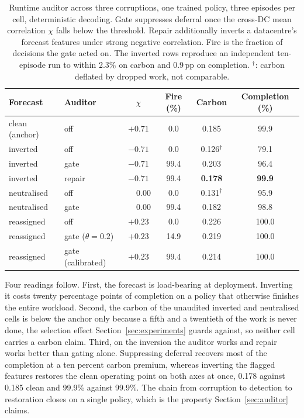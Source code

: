 \documentclass{article} %
\begin{document}
\begin{table}[ht]
\caption{Runtime auditor across three corruptions, one trained policy, three episodes per cell, deterministic decoding. Gate suppresses deferral once the cross-DC mean correlation $\chi$ falls below the threshold. Repair additionally inverts a datacentre's forecast features under strong negative correlation. Fire is the fraction of decisions the gate acted on. The inverted rows reproduce an independent ten-episode run to within 2.3\% on carbon and 0.9\,pp on completion. $^{\dagger}$: carbon deflated by dropped work, not comparable.}
\label{tab:auditor}
\centering
\small
\begin{tabular*}{\linewidth}{@{\extracolsep{\fill}}llcccc@{}}
\toprule
Forecast & Auditor & $\chi$ & Fire (\%) & Carbon & Completion (\%) \\
\midrule
clean (anchor) & off    & $+0.71$ & 0.0  & 0.185 & 99.9 \\
\addlinespace
inverted       & off    & $-0.71$ & 0.0  & 0.126$^{\dagger}$ & 79.1 \\
inverted       & gate   & $-0.71$ & 99.4 & 0.203 & 96.4 \\
inverted       & repair & $-0.71$ & 99.4 & \textbf{0.178} & \textbf{99.9} \\
\addlinespace
neutralised    & off    & $\phantom{+}0.00$ & 0.0  & 0.131$^{\dagger}$ & 95.9 \\
neutralised    & gate   & $\phantom{+}0.00$ & 99.4 & 0.182 & 98.8 \\
\addlinespace
reassigned     & off               & $+0.23$ & 0.0  & 0.226 & 100.0 \\
reassigned     & gate ($\theta{=}0.2$) & $+0.23$ & 14.9 & 0.219 & 100.0 \\
reassigned     & gate (calibrated) & $+0.23$ & 99.4 & 0.214 & 100.0 \\
\bottomrule
\end{tabular*}
\end{table}

Four readings follow. First, the forecast is load-bearing at deployment. Inverting it costs twenty percentage points of completion on a policy that otherwise finishes the entire workload. Second, the carbon of the unaudited inverted and neutralised cells is below the anchor only because a fifth and a twentieth of the work is never done, the selection effect Section~\ref{sec:experiments} guards against, so neither cell carries a carbon claim. Third, on the inversion the auditor works and repair works better than gating alone. Suppressing deferral recovers most of the completion at a ten percent carbon premium, whereas inverting the flagged features restores the clean operating point on both axes at once, 0.178 against 0.185 clean and 99.9\% against 99.9\%. The chain from corruption to detection to restoration closes on a single policy, which is the property Section~\ref{sec:auditor} claims.
\end{document}
